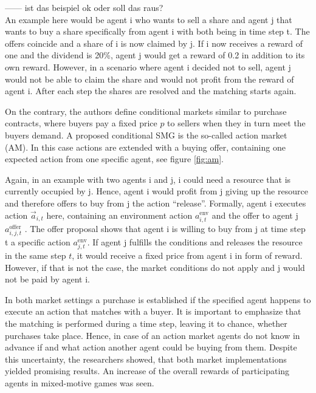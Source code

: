 ------ ist das beispiel ok oder soll das raus? \\
An example here would be agent i who wants to sell a share and agent j that wants to buy a share specifically from agent i with both being in time step t. The offers coincide and a share of i is now claimed by j. If i now receives a reward of one and the dividend is 20\%, agent j would get a reward of 0.2 in addition to its own reward. However, in a scenario where agent i decided not to sell, agent j would not be able to claim the share and would not profit from the reward of agent i. After each step the shares are resolved and the matching starts again.

On the contrary, the authors define conditional markets similar to purchase contracts, where buyers pay a fixed price $p$ to sellers when they in turn meet the buyers demand. A proposed conditional SMG is the so-called action market (AM). In this case actions are extended with a buying offer, containing one expected action from one specific agent, see figure \ref{fig:am}.


Again, in an example with two agents i and j, i could need a resource that is currently occupied by j. Hence, agent i would profit from j giving up the resource and therefore offers to buy from j the action ``release''. Formally, agent i executes action $\overrightarrow{a}_{i,t}$ here, containing an environment action $a^{\text{env}}_{i,t}$ and the offer to agent j $a^{\text{offer}}_{i,j,t}$ \cite{scbe21}. The offer proposal shows that agent i is willing to buy from j at time step t a specific action $a^{\text{env}}_{j,t}$. If agent j fulfills the conditions and releases the resource in the same step $t$, it would receive a fixed price from agent i in form of reward. However, if that is not the case, the market conditions do not apply and j would not be paid by agent i.

In both market settings a purchase is established if the specified agent happens to execute an action that matches with a buyer. It is important to emphasize that the matching is performed during a time step, leaving it to chance, whether purchases take place. Hence, in case of an action market agents do not know in advance if and what action another agent could be buying from them. Despite this uncertainty, the researchers showed, that both market implementations yielded promising results. An increase of the overall rewards of participating agents in mixed-motive games was seen.